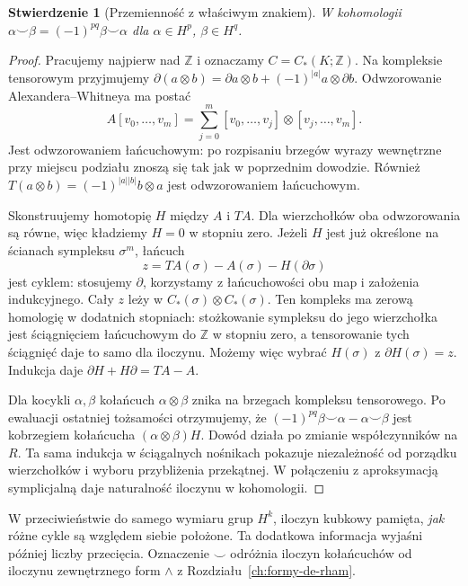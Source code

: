 \documentclass[11pt,a4paper,oneside]{report}
\newcommand{\Z}{\mathbb{Z}}
\theoremstyle{plain}
\newtheorem{stwierdzenie}[twierdzenie]{Stwierdzenie}
\theoremstyle{definition}
\theoremstyle{remark}
\begin{document}
\begin{stwierdzenie}[Przemienność z właściwym znakiem]
\label{prop:kubek-graded-16}
W kohomologii
$\alpha\smile\beta
=(-1)^{pq}\beta\smile\alpha$
dla $\alpha\in H^p$,
$\beta\in H^q$.
\end{stwierdzenie}
\begin{proof}
Pracujemy najpierw nad $\Z$ i oznaczamy $C=C_*(K;\Z)$.
Na kompleksie tensorowym przyjmujemy
$\partial(a\otimes b)=\partial a\otimes b+(-1)^{|a|}a\otimes\partial b$.
Odwzorowanie Alexandera--Whitneya ma postać
\[
 A[v_0,\ldots,v_m]
 =\sum_{j=0}^m[v_0,\ldots,v_j]\otimes[v_j,\ldots,v_m].
\]
Jest odwzorowaniem łańcuchowym: po rozpisaniu brzegów
wyrazy wewnętrzne przy miejscu podziału znoszą się
tak jak w poprzednim dowodzie. Również
$T(a\otimes b)=(-1)^{|a||b|}b\otimes a$
jest odwzorowaniem łańcuchowym.

Skonstruujemy homotopię $H$ między $A$ i $TA$.
Dla wierzchołków oba odwzorowania są równe, więc
kładziemy $H=0$ w stopniu zero. Jeżeli $H$ jest
już określone na ścianach sympleksu $\sigma^m$,
łańcuch
\[
 z=TA(\sigma)-A(\sigma)-H(\partial\sigma)
\]
jest cyklem: stosujemy $\partial$, korzystamy
z łańcuchowości obu map i założenia indukcyjnego.
Cały $z$ leży w $C_*(\sigma)\otimes C_*(\sigma)$.
Ten kompleks ma zerową homologię w dodatnich stopniach:
stożkowanie sympleksu do jego wierzchołka jest
ściągnięciem łańcuchowym do $\Z$ w stopniu zero,
a tensorowanie tych ściągnięć daje to samo dla iloczynu.
Możemy więc wybrać $H(\sigma)$ z $\partial H(\sigma)=z$.
Indukcja daje $\partial H+H\partial=TA-A$.

Dla kocykli $\alpha,\beta$ kołańcuch
$\alpha\otimes\beta$ znika na brzegach kompleksu
tensorowego. Po ewaluacji ostatniej tożsamości
otrzymujemy, że
$(-1)^{pq}\beta\smile\alpha-\alpha\smile\beta$
jest kobrzegiem kołańcucha $(\alpha\otimes\beta)H$.
Dowód działa po zmianie współczynników na $R$.
Ta sama indukcja w ściągalnych nośnikach pokazuje
niezależność od porządku wierzchołków i wyboru
przybliżenia przekątnej. W połączeniu z aproksymacją
symplicjalną daje naturalność iloczynu w kohomologii.
\end{proof}

W przeciwieństwie do samego wymiaru
grup $H^k$, iloczyn kubkowy pamięta,
\emph{jak} różne cykle są względem siebie
położone. Ta dodatkowa informacja
wyjaśni później liczby przecięcia.
Oznaczenie $\smile$ odróżnia
iloczyn kołańcuchów od iloczynu
zewnętrznego form $\wedge$ z
Rozdziału~\ref{ch:formy-de-rham}.
\end{document}
